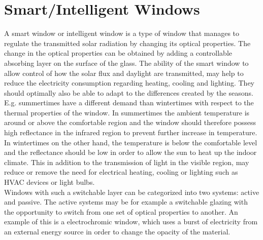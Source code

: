 \section{Smart/Intelligent Windows}
A smart window or intelligent window is a type of window that manages to 
regulate the transmitted solar radiation by changing its optical properties.
The change in the optical properties can be
obtained by adding a controllable absorbing layer on the surface of the glass. 
The ability of the smart window to 
allow control of%
how the solar flux and daylight are transmitted, may help to
reduce the electricity consumption regarding heating, cooling and lighting.
They should optimally also be able to adapt to the differences created by the seasons. E.g. summertimes
have a different demand than wintertimes with respect to the thermal properties of the window. In
summertimes the ambient temperature is around or above the comfortable region and the window should
therefore possess high reflectance in the infrared region to prevent further increase in temperature. 
In wintertimes on the other hand, the temperature is below the comfortable level and the reflectance 
should be low in order to allow the sun to heat up the indoor climate. This in addition to the
transmission of light in the visible region, may reduce or remove the need for electrical heating, cooling
or lighting such as HVAC devices or light bulbs.
\cite{Dussault2012,Jelle2010,White1999} 
\\
Windows with such a
switchable layer can be categorized into two systems: active and passive. 
The active systems may be for example a switchable glazing with the opportunity to switch from 
one set of optical properties to another. An example of this is a electrochromic window, which
uses a burst of electricity from an external energy source in order to change the opacity of the material.
